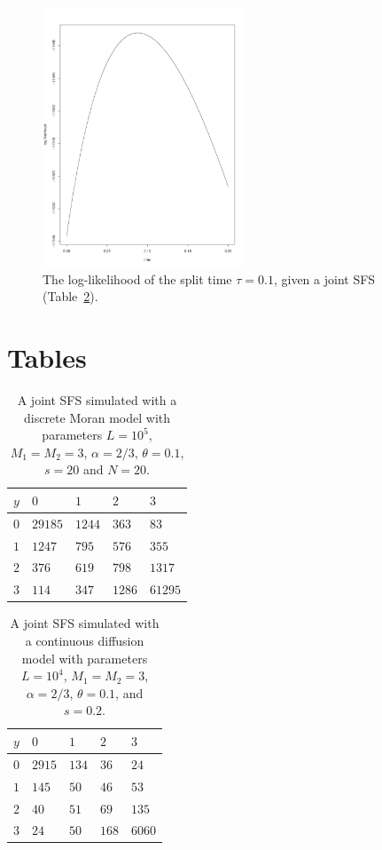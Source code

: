 \documentclass[preprint]{elsarticle}
\begin{document}
\begin{figure}[ht]
\includegraphics[width = 6cm]{forw_back_ll_cont.pdf}
\caption{The log-likelihood of the split time $\tau=0.1$, given a joint SFS (Table~\ref{jointSFScont}).}\label{twoPopcont}
\end{figure}

\newpage

\section*{Tables}

\begin{table}[ht]
\centering
\caption{A joint SFS simulated with a discrete Moran model with parameters $L=10^5$, $M_1=M_2=3$, $\alpha=2/3$, $\theta=0.1$, $s=20$ and $N=20$.}
  \begin{tabular}{lllll}
  \toprule
    $y$&$0$&$1$&$2$&$3$\\
    \midrule
    $0$  &$29185$ &$1244$ &$363$  &$83$\\       
    $1$  &$1247$  &$795$  &$576$  &$355$\\       
    $2$  &$376$   &$619$  &$798$  &$1317$\\      
    $3$  &$114$   &$347$  &$1286$ &$61295$\\    
    \bottomrule
  \end{tabular}\label{jointSFSdiscr}
\end{table}

\begin{table}[ht]
\centering
\caption{A joint SFS simulated with a continuous diffusion model with parameters $L=10^4$, $M_1=M_2=3$, $\alpha=2/3$, $\theta=0.1$, and $s=0.2$.}
  \begin{tabular}{lllll}
  \toprule
    $y$&$0$&$1$&$2$&$3$\\
    \midrule
    $0$  &$2915$ &$134$ &$36$  &$24$\\
    $1$  &$145$  &$50$ &$46$ &$53$\\
    $2$  &$40$   &$51$ &$69$ &$135$\\
    $3$  &$24$   &$50$  &$168$ &$6060$\\
    \bottomrule
  \end{tabular}\label{jointSFScont}
\end{table}
\end{document}
